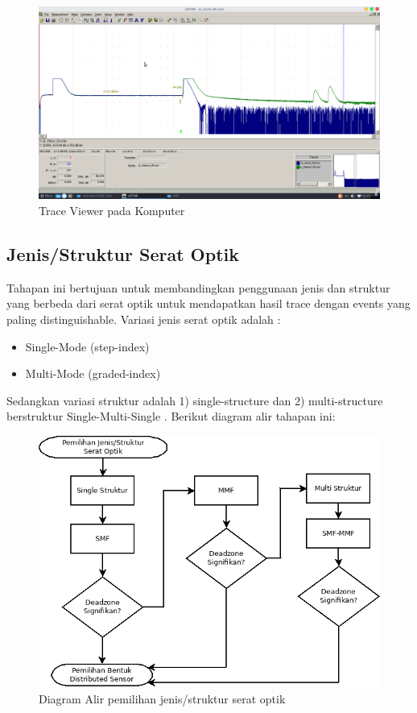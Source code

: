 \documentclass[12pt]{article}
\begin{document}
	\begin{figure}[h!]
		\centering
		\captionsetup{justification=centering}
		\includegraphics[width=0.7\linewidth]{images/Bab_3/Bab_3_5}
		\caption[Trace Viewer pada Komputer]{\small{Trace Viewer pada Komputer}}
	\end{figure}

	\subsection{Jenis/Struktur Serat Optik}
	
	Tahapan ini bertujuan untuk membandingkan penggunaan jenis dan struktur yang berbeda dari serat optik untuk mendapatkan hasil trace dengan events yang paling distinguishable.
	Variasi jenis serat optik adalah \cite{Hafid2014}:
	
	\begin{itemize}
		\item Single-Mode (step-index)
		\item Multi-Mode (graded-index)
	\end{itemize}

	Sedangkan variasi struktur adalah 1) single-structure dan 2) multi-structure berstruktur Single-Multi-Single \cite{Diana}.
	Berikut diagram alir tahapan ini:
	
	\begin{figure}[h!]
		\centering
		\captionsetup{justification=centering}
		\includegraphics[width=0.7\linewidth]{images/Bab_3/Bab_3_6}
		\caption[Diagram Alir]{\small{Diagram Alir pemilihan jenis/struktur serat optik}}
	\end{figure}
	
\end{document}
